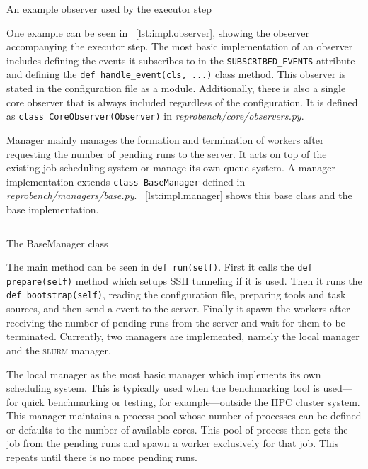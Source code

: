 \begin{listing}
    \inputminted[firstline=7,lastline=13]{python}{assets/listings/reprobench/reprobench/executors/base.py}
    \caption{An example observer used by the executor step}
    \label{lst:impl.observer}
\end{listing}

One example can be seen in \lst~\ref{lst:impl.observer}, showing the observer accompanying the executor step.
The most basic implementation of an observer includes defining the events it subscribes to in the \texttt{SUBSCRIBED_EVENTS} attribute and defining the \texttt{def handle_event(cls, ...)} class method.
This observer is stated in the configuration file as a module.
Additionally, there is also a single core observer that is always included regardless of the configuration.
It is defined as \texttt{class CoreObserver(Observer)} in \emph{reprobench/core/observers.py}.

Manager mainly manages the formation and termination of workers after requesting the number of pending runs to the server.
It acts on top of the existing job scheduling system or manage its own queue system.
A manager implementation extends \texttt{class BaseManager} defined in \emph{reprobench/managers/base.py}.
\lst~\ref{lst:impl.manager} shows this base class and the base implementation.

\begin{listing}
    \inputminted{python}{assets/listings/pseudocodes/manager.py}
    \caption{The BaseManager class}
    \label{lst:impl.manager}
\end{listing}

The main method can be seen in \texttt{def run(self)}.
First it calls the \texttt{def prepare(self)} method which setups SSH tunneling if it is used.
Then it runs the \texttt{def bootstrap(self)}, reading the configuration file, preparing tools and task sources, and then send a  event to the server.
Finally it spawn the workers after receiving the number of pending runs from the server and wait for them to be terminated.
Currently, two managers are implemented, namely the local manager and the \textsc{slurm} manager.

The local manager as the most basic manager which implements its own scheduling system.
This is typically used when the benchmarking tool is used---for quick benchmarking or testing, for example---outside the HPC cluster system.
This manager maintains a process pool whose number of processes can be defined or defaults to the number of available cores.
This pool of process then gets the job from the pending runs and spawn a worker exclusively for that job.
This repeats until there is no more pending runs.

